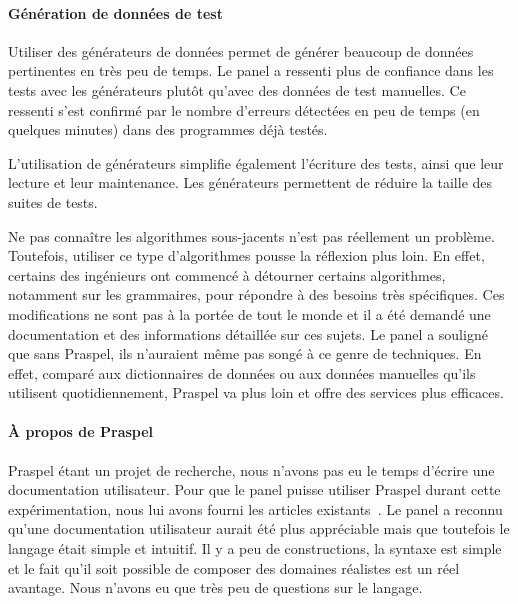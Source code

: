 \paragraph{Génération de données de test} Utiliser des générateurs de données
permet de générer beaucoup de données pertinentes en très peu de temps. Le panel
a ressenti plus de confiance dans les tests avec les générateurs plutôt qu'avec
des données de test manuelles. Ce ressenti s'est confirmé par le nombre
d'erreurs détectées en peu de temps (en quelques minutes) dans des programmes
déjà testés.

L'utilisation de générateurs simplifie également l'écriture des tests, ainsi que
leur lecture et leur maintenance. Les générateurs permettent de réduire la
taille des suites de tests.

Ne pas connaître les algorithmes sous-jacents n'est pas réellement un problème.
Toutefois, utiliser ce type d'algorithmes pousse la réflexion plus loin. En
effet, certains des ingénieurs ont commencé à détourner certains algorithmes,
notamment sur les grammaires, pour répondre à des besoins très spécifiques. Ces
modifications ne sont pas à la portée de tout le monde et il a été demandé une
documentation et des informations détaillée sur ces sujets. Le panel a souligné
que sans Praspel, ils n'auraient même pas songé à ce genre de techniques. En
effet, comparé aux dictionnaires de données ou aux données manuelles qu'ils
utilisent quotidiennement, Praspel va plus loin et offre des services plus
efficaces.

\paragraph{À propos de Praspel} Praspel étant un projet de recherche, nous
n'avons pas eu le temps d'écrire une documentation utilisateur. Pour que le
panel puisse utiliser Praspel durant cette expérimentation, nous lui avons
fourni les articles existants~. Le panel a reconnu qu'une documentation utilisateur aurait été
plus appréciable mais que toutefois le langage était simple et intuitif. Il y a
peu de constructions, la syntaxe est simple et le fait qu'il soit possible de
composer des domaines réalistes est un réel avantage. Nous n'avons eu que très
peu de questions sur le langage.

